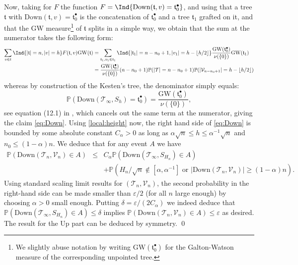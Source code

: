 Now, taking for $F$ the function $F=\Ind{\mathrm{Down}(\mathfrak{t},v)=\mathfrak{t}_0^{\bullet}}$, and using that a tree $\mathfrak{t}$ with $\mathrm{Down}(\mathfrak{t},v)= \mathfrak{t}_0^{\bullet}$ is the concatenation of $\mathfrak{t}_0^{\bullet}$ and a tree  $\mathfrak{t}_1$ grafted on it, and that the $\mathrm{GW}$ measure\footnote{We slightly abuse notation by writing 
$\mathrm{GW}(\mathfrak{t}_0^{\bullet})$ for the Galton-Watson measure of the corresponding unpointed tree.} of $\mathfrak{t}$ splits in a simple way, we obtain that the sum at the numerator takes the following form:
\begin{align*}
\sum_{v\in t} \Ind{|\mathfrak{t}|=n, |v|=h} F(\mathfrak{t},v) \mathrm{GW}(\mathfrak{t})
& =\sum_{\mathfrak{t}_1, v_1 \in \mathfrak{t}_1}  \Ind{|\mathfrak{t}_1|=n-n_0+1, |v_1|=h-\lfloor h/2\rfloor} \frac{\mathrm{GW}(\mathfrak{t}_0^{\bullet})}{\nu(\{0\})} \mathrm{GW}(\mathfrak{t}_1) \\
%
& =\frac{\mathrm{GW}(\mathfrak{t}_0^{\bullet}) }{\nu(\{0\})} (n-n_0+1) \mathbb{P}(|\mathcal T|=n-n_0+1) \mathbb{P}(|\mathcal V_{n-n_0+1}|=h-\lfloor h/2\rfloor)
\end{align*}  
whereas  by construction of the Kesten's tree, the denominator simply equals:
$$\mathbb{P}(\mathrm{Down}(  \mathcal{T}_{\infty},  S_{h})  = \mathfrak{t}_0^{\bullet}) = \frac{\mathrm{GW}(\mathfrak{t}_0^{\bullet}) }{\nu(\{0\})},$$
%
see equation (12.1) in \cite{LP16},
which cancels out the same term at the numerator, giving the claim \eqref{eq:Down}.
Using \eqref{local:height} now, the right hand side of \eqref{eq:Down} is bounded by some absolute constant $C_{\alpha}>0$ as long as $ \alpha \sqrt{n} \leq h \leq \alpha^{-1} \sqrt{n}$ and $n_{0} \leq (1- \alpha) n$. We deduce that for any event $A$ we have 
 \begin{eqnarray*} \mathbb{P}(\mathrm{Down}(  \mathcal{T}_{n},  \mathcal{V}_{n}) \in A) &\leq& C_{\alpha}   \mathbb{P}(\mathrm{Down}(  \mathcal{T}_{\infty},  S_{H_{n}}) \in A)\\ &&  + \mathbb{P}( H_{n}/\sqrt{n} \notin [ \alpha, \alpha^{-1}]  \mbox{ \ \ or \ \ } |\mathrm{Down}(  \mathcal{T}_{n},  \mathcal{V}_{n})| \geq (1- \alpha)n).  \end{eqnarray*}
Using standard scaling limit results for $ (\mathcal{T}_{n}, \mathcal{V}_{n})$,  
%
the second probability in the right-hand side can be made smaller than $\varepsilon/2$  (for all $n$ large enough) by choosing $\alpha>0$ small enough. Putting $\delta =\varepsilon/(2 C_{ \alpha})$ we indeed deduce that $\mathbb{P}(\mathrm{Down}(  \mathcal{T}_{\infty},  S_{H_{n}}) \in A) \leq \delta$ implies $\mathbb{P}(\mathrm{Down}(  \mathcal{T}_{n},  \mathcal{V}_{n}) \in A)  \leq \varepsilon$ as desired.
The result for the $ \mathrm{Up}$ part can be deduced by symmetry. 
\qed 

